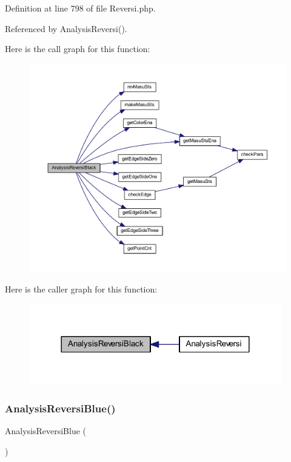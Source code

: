 Definition at line 798 of file Reversi.\+php.



Referenced by Analysis\+Reversi().

Here is the call graph for this function\+:\nopagebreak
\begin{figure}[H]
\begin{center}
\leavevmode
\includegraphics[width=350pt]{class_reversi_a471972ec549188f7eb701d57e14ae7a1_cgraph}
\end{center}
\end{figure}
Here is the caller graph for this function\+:\nopagebreak
\begin{figure}[H]
\begin{center}
\leavevmode
\includegraphics[width=312pt]{class_reversi_a471972ec549188f7eb701d57e14ae7a1_icgraph}
\end{center}
\end{figure}
\mbox{\label{class_reversi_a3b581c4861bda72706a1d7146c910ad2}} 
\subsubsection{\texorpdfstring{Analysis\+Reversi\+Blue()}{AnalysisReversiBlue()}}
{\footnotesize\ttfamily Analysis\+Reversi\+Blue (\begin{DoxyParamCaption}{ }\end{DoxyParamCaption})\hspace{0.3cm}{\ttfamily [private]}}



